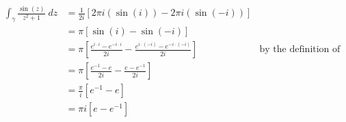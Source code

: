 \documentclass[10pt,a4paper]{article}
\theoremstyle{definition}
\begin{document}
\begin{enumerate}[label = (\alph*)]
\begin{itemize}
	\begin{align*}
	\int_{\gamma} \frac{\sin(z)}{z^2 + 1} \; dz &= \frac{1}{2i}\left[2\pi i (\sin(i)) - 2\pi i (\sin(-i))\right]\\
	&= \pi[\sin(i) - \sin(-i)]\\
	&= \pi\left[\frac{e^{i\cdot i} - e^{-i \cdot i}}{2i} - \frac{e^{i \cdot (-i)} - e^{-i \cdot (-i)}}{2i}\right] &\text{by the definition of the complex sine function}\\
	&= \pi \left[\frac{e^{-1} - e}{2i} - \frac{e - e^{-1}}{2i}\right]\\
	&= \frac{\pi}{i}\left[e^{-1} - e\right]\\
	&= \boxed{\pi i \left[e - e^{-1}\right]}
	\end{align*}
	\end{itemize}
\end{enumerate}
\end{document}
